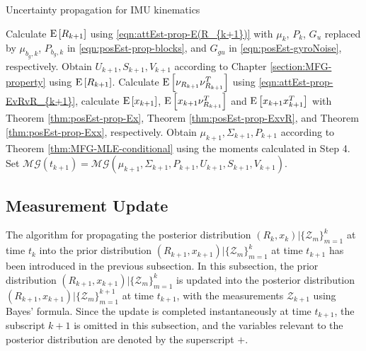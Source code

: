 \begin{table}
	\caption{Uncertainty propagation for IMU kinematics}
	\label{tab:posEst-prop}
	\begin{algorithmic}[1]
		\algrule[0.8pt]
		\algrule
		\State Calculate $\mathrm{E}\left[ R_{k+1} \right]$ using \eqref{eqn:attEst-prop-E(R_{k+1})} with $\mu_k$, $P_k$, $G_u$ replaced by $\mu_{b_g,k}$, $P_{b_g,k}$ in \eqref{eqn:posEst-prop-blocks}, and $G_{gu}$ in \eqref{eqn:posEst-gyroNoise}, respectively.
		\State Obtain $U_{k+1},S_{k+1},V_{k+1}$ according to Chapter \ref{section:MFG-property} using $\mathrm{E}\left[ R_{k+1} \right]$.
		\State Calculate $\mathrm{E}\left[ \nu_{R_{k+1}}\nu_{R_{k+1}}^T \right]$ using \eqref{eqn:attEst-prop-EvRvR_{k+1}}, calculate $\mathrm{E}\left[ x_{k+1} \right]$, $\mathrm{E}\left[ x_{k+1}\nu_{R_{k+1}}^T \right]$ and $\mathrm{E}\left[ x_{k+1}x_{k+1}^T \right]$ with Theorem \ref{thm:posEst-prop-Ex}, Theorem \ref{thm:posEst-prop-ExvR}, and Theorem \ref{thm:posEst-prop-Exx}, respectively.
		\State Obtain $\mu_{k+1},\Sigma_{k+1},P_{k+1}$ according to Theorem \ref{thm:MFG-MLE-conditional} using the moments calculated in Step 4.
		\State Set $\mathcal{MG}(t_{k+1}) = \mathcal{MG}(\mu_{k+1},\Sigma_{k+1},P_{k+1},U_{k+1},S_{k+1},V_{k+1})$.
		\EndProcedure
		\algrule[0.8pt]
	\end{algorithmic}
\end{table}

\subsection{Measurement Update} \label{section:posEst-update}

The algorithm for propagating the posterior distribution $(R_k,x_k) | \{\mathcal{Z}_{m}\}_{m=1}^k$ at time $t_k$ into the prior distribution $(R_{k+1},x_{k+1}) | \{\mathcal{Z}_{m}\}_{m=1}^k$ at time $t_{k+1}$ has been introduced in the previous subsection.
In this subsection, the prior distribution $(R_{k+1},x_{k+1}) | \{\mathcal{Z}_{m}\}_{m=1}^k$ is updated into the posterior distribution $(R_{k+1},x_{k+1}) | \{\mathcal{Z}_{m}\}_{m=1}^{k+1}$ at time $t_{k+1}$, with the measurements $\mathcal{Z}_{k+1}$ using Bayes' formula.
Since the update is completed instantaneously at time $t_{k+1}$, the subscript $k+1$ is omitted in this subsection, and the variables relevant to the posterior distribution are denoted by the superscript $+$.

